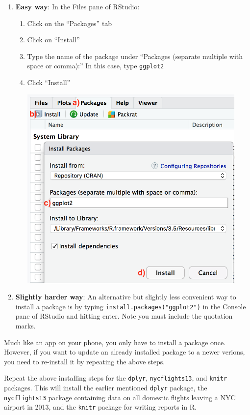 \documentclass[
  letterpaper,
  DIV=11,
  numbers=noendperiod]{scrreprt}
\theoremstyle{definition}
\theoremstyle{remark}
\begin{document}
\begin{enumerate}
\def\labelenumi{\arabic{enumi}.}
\item
  \textbf{Easy way}: In the Files pane of RStudio:

  \begin{enumerate}
  \def\labelenumii{\alph{enumii})}
  \item
    Click on the ``Packages'' tab
  \item
    Click on ``Install''
  \item
    Type the name of the package under ``Packages (separate multiple
    with space or comma):'' In this case, type \texttt{ggplot2}
  \item
    Click ``Install''

    \includegraphics[width=\textwidth,height=4in]{images/install_packages_easy_way.png}
  \end{enumerate}
\item
  \textbf{Slightly harder way}: An alternative but slightly less
  convenient way to install a package is by typing
  \texttt{install.packages("ggplot2")} in the Console pane of RStudio
  and hitting enter. Note you must include the quotation marks.
\end{enumerate}

Much like an app on your phone, you only have to install a package once.
However, if you want to update an already installed package to a newer
verions, you need to re-install it by repeating the above steps.

\begin{tcolorbox}[enhanced jigsaw, coltitle=black, toprule=.15mm, bottomtitle=1mm, breakable, leftrule=.75mm, title={{🎯} Learning Check 1.1}, opacitybacktitle=0.6, colback=white, rightrule=.15mm, opacityback=0, toptitle=1mm, colbacktitle=quarto-callout-tip-color!10!white, colframe=quarto-callout-tip-color-frame, titlerule=0mm, arc=.35mm, bottomrule=.15mm, left=2mm]
Repeat the above installing steps for the \texttt{dplyr},
\texttt{nycflights13}, and \texttt{knitr} packages. This will install
the earlier mentioned \texttt{dplyr} package, the \texttt{nycflights13}
package containing data on all domestic flights leaving a NYC airport in
2013, and the \texttt{knitr} package for writing reports in R.
\end{tcolorbox}
\end{document}
